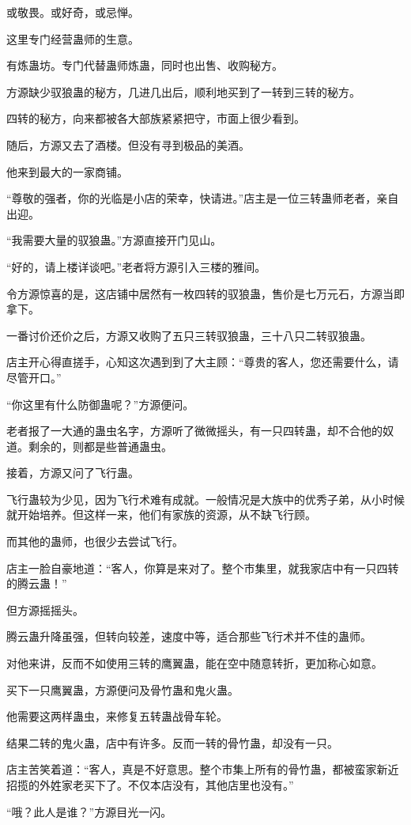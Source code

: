 \begin{this_body}
或敬畏。或好奇，或忌惮。

这里专门经营蛊师的生意。

有炼蛊坊。专门代替蛊师炼蛊，同时也出售、收购秘方。

方源缺少驭狼蛊的秘方，几进几出后，顺利地买到了一转到三转的秘方。

四转的秘方，向来都被各大部族紧紧把守，市面上很少看到。

随后，方源又去了酒楼。但没有寻到极品的美酒。

他来到最大的一家商铺。

“尊敬的强者，你的光临是小店的荣幸，快请进。”店主是一位三转蛊师老者，亲自出迎。

“我需要大量的驭狼蛊。”方源直接开门见山。

“好的，请上楼详谈吧。”老者将方源引入三楼的雅间。

令方源惊喜的是，这店铺中居然有一枚四转的驭狼蛊，售价是七万元石，方源当即拿下。

一番讨价还价之后，方源又收购了五只三转驭狼蛊，三十八只二转驭狼蛊。

店主开心得直搓手，心知这次遇到到了大主顾：“尊贵的客人，您还需要什么，请尽管开口。”

“你这里有什么防御蛊呢？”方源便问。

老者报了一大通的蛊虫名字，方源听了微微摇头，有一只四转蛊，却不合他的奴道。剩余的，则都是些普通蛊虫。

接着，方源又问了飞行蛊。

飞行蛊较为少见，因为飞行术难有成就。一般情况是大族中的优秀子弟，从小时候就开始培养。但这样一来，他们有家族的资源，从不缺飞行顾。

而其他的蛊师，也很少去尝试飞行。

店主一脸自豪地道：“客人，你算是来对了。整个市集里，就我家店中有一只四转的腾云蛊！”

但方源摇摇头。

腾云蛊升降虽强，但转向较差，速度中等，适合那些飞行术并不佳的蛊师。

对他来讲，反而不如使用三转的鹰翼蛊，能在空中随意转折，更加称心如意。

买下一只鹰翼蛊，方源便问及骨竹蛊和鬼火蛊。

他需要这两样蛊虫，来修复五转蛊战骨车轮。

结果二转的鬼火蛊，店中有许多。反而一转的骨竹蛊，却没有一只。

店主苦笑着道：“客人，真是不好意思。整个市集上所有的骨竹蛊，都被蛮家新近招揽的外姓家老买下了。不仅本店没有，其他店里也没有。”

“哦？此人是谁？”方源目光一闪。

\end{this_body}

